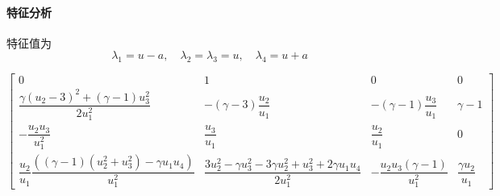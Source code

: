 \documentclass{book}
\begin{document}
\paragraph{特征分析}
特征值为
\begin{equation}
    \lambda_{1}=u-a, \quad \lambda_{2}=\lambda_{3}=u, \quad \lambda_{4}=u+a
\end{equation}

\begin{equation}
    \begin{bmatrix}
        0                                                                                                & 1                                                                                                   & 0                                         & 0                           \\
        \dfrac{\gamma (u_{2}-3)^{2}+(\gamma-1) u_{3}^{2}}{2 u_{1}^{2}}                                   & -(\gamma-3)\dfrac{u_{2}}{u_{1}}                                                                     & -(\gamma-1)\dfrac{u_{3}}{u_{1}}           & \gamma-1                    \\
        -\dfrac{u_{2} u_{3}}{u_{1}^{2}}                                                                  & \dfrac{u_{3}}{u_{1}}                                                                                & \dfrac{u_{2}}{u_{1}}                      & 0                           \\
        \dfrac{u_{2}}{u_1}\dfrac{\left((\gamma-1)(u_{2}^{2}+u_3^2)-\gamma u_{1} u_{4}\right)}{u_{1}^{2}} & \dfrac{3 u_{2}^{2}-\gamma u_{3}^{2}-3 \gamma u_{2}^{2}+u_{3}^{2}+2 \gamma u_{1} u_{4}}{2 u_{1}^{2}} & -\dfrac{u_{2} u_{3}(\gamma-1)}{u_{1}^{2}} & \dfrac{\gamma u_{2}}{u_{1}}
    \end{bmatrix}
\end{equation}
\end{document}
